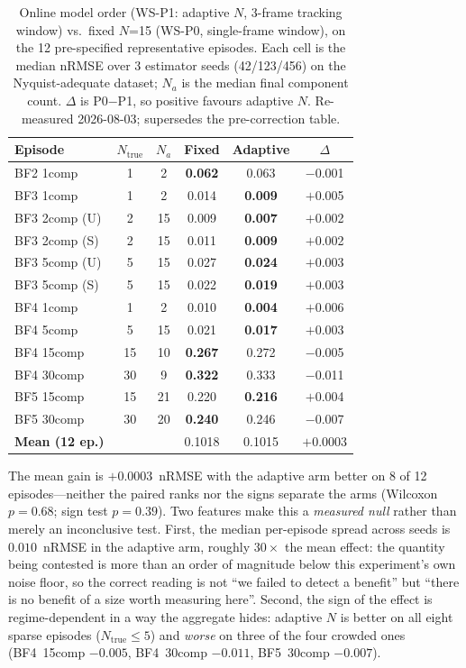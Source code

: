 \begin{table}[t]
\centering
\caption{Online model order (WS-P1: adaptive $N$, 3-frame tracking window)
vs.\ fixed $N$=15 (WS-P0, single-frame window), on the 12 pre-specified
representative episodes.  Each cell is the median nRMSE over 3 estimator
seeds (42/123/456) on the Nyquist-adequate dataset; $N_a$ is the median
final component count.  $\Delta$ is P0$-$P1, so positive favours adaptive
$N$.  Re-measured 2026-08-03; supersedes the pre-correction table.}
\label{tab:adaptive}
\begin{tabular}{lccccc}
\toprule
Episode & $N_{\text{true}}$ & $N_a$ & Fixed & Adaptive & $\Delta$ \\
\midrule
BF2 1comp  &  1 &  2 & \textbf{0.062} & 0.063 & $-$0.001 \\
BF3 1comp  &  1 &  2 & 0.014 & \textbf{0.009} & $+$0.005 \\
BF3 2comp (U) &  2 & 15 & 0.009 & \textbf{0.007} & $+$0.002 \\
BF3 2comp (S) &  2 & 15 & 0.011 & \textbf{0.009} & $+$0.002 \\
BF3 5comp (U) &  5 & 15 & 0.027 & \textbf{0.024} & $+$0.003 \\
BF3 5comp (S) &  5 & 15 & 0.022 & \textbf{0.019} & $+$0.003 \\
BF4 1comp  &  1 &  2 & 0.010 & \textbf{0.004} & $+$0.006 \\
BF4 5comp  &  5 & 15 & 0.021 & \textbf{0.017} & $+$0.003 \\
BF4 15comp & 15 & 10 & \textbf{0.267} & 0.272 & $-$0.005 \\
BF4 30comp & 30 &  9 & \textbf{0.322} & 0.333 & $-$0.011 \\
BF5 15comp & 15 & 21 & 0.220 & \textbf{0.216} & $+$0.004 \\
BF5 30comp & 30 & 20 & \textbf{0.240} & 0.246 & $-$0.007 \\
\midrule
\textbf{Mean (12 ep.)} & & & 0.1018 & 0.1015 & $+$0.0003 \\
\bottomrule
\end{tabular}
\end{table}

The mean gain is $+0.0003$~nRMSE with the adaptive arm better on 8 of 12
episodes---neither the paired ranks nor the signs separate the arms
(Wilcoxon $p=0.68$; sign test $p=0.39$).  Two features make this a
\emph{measured null} rather than merely an inconclusive test.  First, the
median per-episode spread across seeds is $0.010$~nRMSE in the adaptive arm,
roughly $30\times$ the mean effect: the quantity being contested is more than
an order of magnitude below this experiment's own noise floor, so the correct
reading is not ``we failed to detect a benefit'' but ``there is no benefit of
a size worth measuring here''.  Second, the sign of the effect is
regime-dependent in a way the aggregate hides: adaptive $N$ is better on all
eight sparse episodes ($N_{\text{true}}\leq5$) and \emph{worse} on three of
the four crowded ones (BF4~15comp $-0.005$, BF4~30comp $-0.011$,
BF5~30comp $-0.007$).

